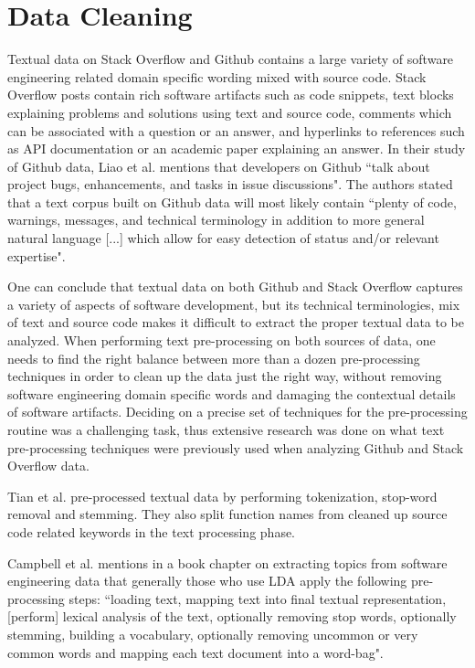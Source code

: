 \section{Data Cleaning}
Textual data on Stack Overflow and Github contains a large variety of software engineering related domain specific wording mixed with source code. Stack Overflow posts contain rich software artifacts such as code snippets, text blocks explaining problems and solutions using text and source code, comments which can be associated with a question or an answer, and hyperlinks to references such as API documentation or an academic paper explaining an answer. In their study of Github data, Liao et al. \cite{liao2019status} mentions that developers on Github ``talk about project bugs, enhancements, and tasks in issue discussions". The authors stated that a text corpus built on Github data will most likely contain ``plenty of code, warnings, messages, and technical terminology in addition to more general natural language [...] which allow for easy detection of status and/or relevant expertise".

One can conclude that textual data on both Github and Stack Overflow captures a variety of aspects of software development, but its technical terminologies, mix of text and source code makes it difficult to extract the proper textual data to be analyzed. When performing text pre-processing on both sources of data, one needs to find the right balance between more than a dozen pre-processing techniques in order to clean up the data just the right way, without removing software engineering domain specific words and damaging the contextual details of software artifacts. Deciding on a precise set of techniques for the pre-processing routine was a challenging task, thus extensive research was done on what text pre-processing techniques were previously used when analyzing Github and Stack Overflow data.

Tian et al. \cite{tian2013predicting} pre-processed textual data by performing tokenization, stop-word removal and stemming. They also split function names from cleaned up source code related keywords in the text processing phase.

Campbell et al. \cite{campbell2015latent} mentions in a book chapter on extracting topics from software engineering data that generally those who use LDA apply the following pre-processing steps: ``loading text, mapping text into final textual representation, [perform] lexical analysis of the text, optionally removing stop words, optionally stemming, building a vocabulary, optionally removing uncommon or very common words and mapping each text document into a word-bag".

